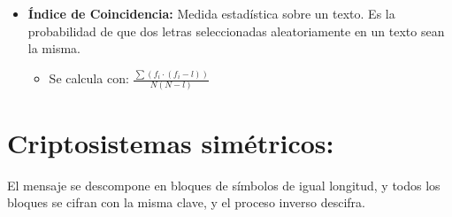 \documentclass[12pt, twoside, openright]{report} %
\begin{document}
\begin{itemize}
\begin{itemize}
	      \end{itemize}
	      \pagebreak
	\item \textbf{Índice de Coincidencia:} Medida estadística sobre un texto. Es la probabilidad de que dos letras seleccionadas aleatoriamente en un texto sean la misma.
	      \begin{itemize}
		      \item Se calcula con: $\frac{\sum\limits(f_i \cdot (f_i - l))}{N(N-l)}$
	      \end{itemize}
\end{itemize}

\section{Criptosistemas simétricos:} El mensaje se descompone en bloques de símbolos de igual longitud, y todos los bloques se cifran con la misma clave, y el proceso inverso descifra.
\end{document}
